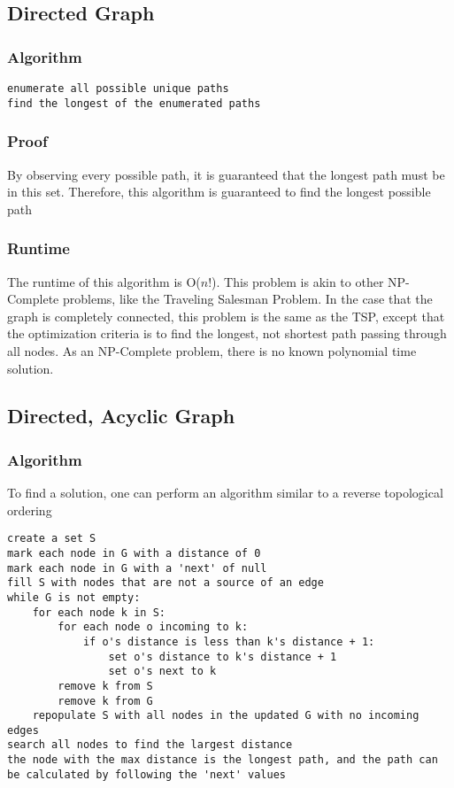 \documentclass[titlepage]{article}
\numberwithin{equation}{subsection}
\begin{document}
\subsection{Directed Graph}
\subsubsection{Algorithm}
\begin{lstlisting}
enumerate all possible unique paths
find the longest of the enumerated paths
\end{lstlisting}
\subsubsection{Proof}
By observing every possible path, it is guaranteed that the
longest path must be in this set. Therefore, this algorithm is
guaranteed to find the longest possible path
\subsubsection{Runtime}
The runtime of this algorithm is O($n!$). This problem is akin to
other NP-Complete problems, like the Traveling Salesman Problem. In
the case that the graph is completely connected, this problem is the same
as the TSP, except that the optimization criteria is to find the longest,
not shortest path passing through all nodes. As an NP-Complete problem,
there is no known polynomial time solution.
\subsection{Directed, Acyclic Graph}
\subsubsection{Algorithm}
To find a solution, one can perform an algorithm similar to a reverse topological ordering\\
\begin{minipage}{\linewidth}
\begin{lstlisting}
create a set S
mark each node in G with a distance of 0
mark each node in G with a 'next' of null
fill S with nodes that are not a source of an edge
while G is not empty:
    for each node k in S:
        for each node o incoming to k:
            if o's distance is less than k's distance + 1:
                set o's distance to k's distance + 1
                set o's next to k
        remove k from S
        remove k from G
    repopulate S with all nodes in the updated G with no incoming edges
search all nodes to find the largest distance
the node with the max distance is the longest path, and the path can be calculated by following the 'next' values
\end{lstlisting}
\end{minipage}
\end{document}
